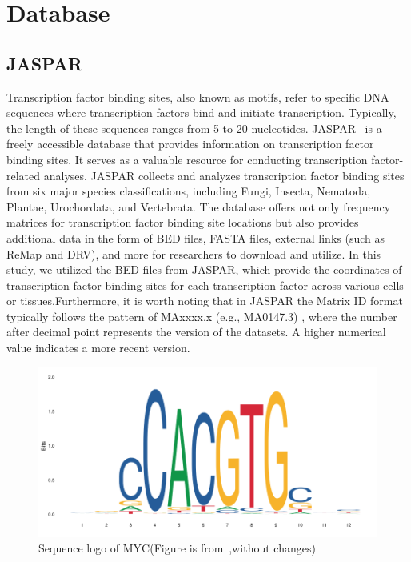 \documentclass{PHlab-thesis}
\begin{document}
\section{Database}
\subsection{JASPAR}
Transcription factor binding sites, also known as motifs, refer to specific DNA sequences where transcription factors bind and initiate transcription. Typically, the length of these sequences ranges from 5 to 20 nucleotides. JASPAR~\cite{10.1093/nar/gkab1113} is a freely accessible database that provides information on transcription factor binding sites. It serves as a valuable resource for conducting transcription factor-related analyses. JASPAR collects and analyzes transcription factor binding sites from six major species classifications, including Fungi, Insecta, Nematoda, Plantae, Urochordata, and Vertebrata. The database offers not only frequency matrices for transcription factor binding site locations but also provides additional data in the form of BED files, FASTA files, external links (such as ReMap and DRV), and more for researchers to download and utilize. In this study, we utilized the BED files from JASPAR, which provide the coordinates of transcription factor binding sites for each transcription factor across various cells or tissues.Furthermore, it is worth noting that in JASPAR the Matrix ID format typically follows the pattern of MAxxxx.x (e.g., MA0147.3) , where the number after decimal point represents the version of the datasets. A higher numerical value indicates a more recent version.

\begin{figure}[H]
	\centering
	\includegraphics[scale=0.4]{figures/MA0147.3.png}
	\caption{Sequence logo of MYC(Figure is from~\cite{10.1093/nar/gkab1113},without changes)}
	\label{fig:MA0147} %
\end{figure}
\end{document}
